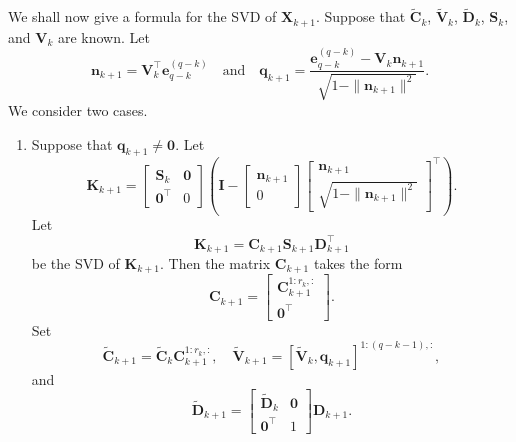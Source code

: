 \documentclass[11pt,a4paper]{article}
\newcommand{\0}{\M{0}}
\newcommand{\M}[1]{\mathbf{#1}}
\newcommand{\Mt}[1]{\tilde{\M{#1}}}
\newcommand{\T}{\top}
\newcommand{\ve}[1]{\mathbf{#1}}
\newcommand{\eve}[2]{\mathbf{e}^{(#1)}_{#2}}
\begin{document}
We shall now give a formula for the SVD of $\M{X}_{k+1}$. Suppose that $\Mt{C}_k$, $\Mt{V}_k$, $\Mt{D}_k$, $\M{S}_k$, and $\M{V}_k$ are known. Let
\begin{displaymath}
  \ve{n}_{k+1} = \M{V}_k^\T \eve{q-k}{q-k}
  \quad
  \text{and}
  \quad
  \ve{q}_{k+1} =  \frac{\eve{q-k}{q-k} - \M{V}_k \ve{n}_{k+1}}{\sqrt{1 - \| \ve{n}_{k+1}\|^2}}.
\end{displaymath}
We consider two cases.
\begin{enumerate}[font=\upshape,label=(\roman*),wide,align=right]
\item Suppose that $\ve{q}_{k+1} \neq \0$. Let
\begin{displaymath}
  \M{K}_{k+1}
  =
  \begin{bmatrix}
    \M{S}_k & \0
    \\
    \0^\T & 0
  \end{bmatrix}
  \left(
    \M{I}
    -
    \begin{bmatrix}
      \ve{n}_{k+1}
      \\
      0
    \end{bmatrix}
    \begin{bmatrix}
      \ve{n}_{k+1}
      \\
      \sqrt{1 - \| \ve{n}_{k+1} \|^2}
    \end{bmatrix}^\T
  \right).
\end{displaymath}
Let
\begin{displaymath}
  \M{K}_{k+1} = \M{C}_{k+1} \M{S}_{k+1}  \M{D}_{k+1}^\T
\end{displaymath}
be the SVD of $\M{K}_{k+1}$.  Then the matrix $\M{C}_{k+1}$ takes the form
\begin{displaymath}
  \M{C}_{k+1}
  =
  \begin{bmatrix}
    \M{C}_{k+1}^{1:r_k, :} 
    \\
    \0^\T 
  \end{bmatrix}.
\end{displaymath}
Set
\begin{displaymath}
  \Mt{C}_{k+1} = \Mt{C}_k \M{C}^{1:r_k, :}_{k+1},
  \quad
  \Mt{V}_{k+1}
  =
  [\Mt{V}_k,  \ve{q}_{k+1}]^{1:(q-k-1),:},
\end{displaymath}
and
\begin{displaymath}
  \Mt{D}_{k+1}
  =
  \begin{bmatrix}
    \Mt{D}_k & \0
    \\
    \0^\T & 1
  \end{bmatrix}
  \M{D}_{k+1}.
\end{displaymath}

\end{enumerate}
\end{document}
